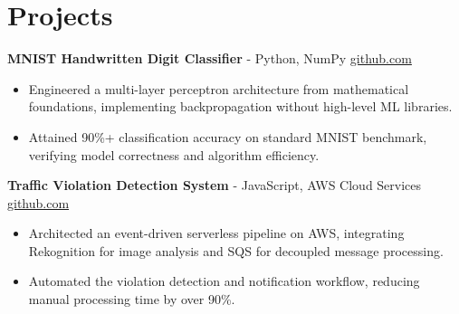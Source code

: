 \documentclass[11pt]{article}       %
\begin{document}

\vspace{-18.5pt}

\section*{Projects}

\textbf{MNIST Handwritten Digit Classifier}{ - Python, NumPy} \hfill \href{https://github.com/Monica20030707/Artificial-Neutral-Network_ML}{github.com} \\
\vspace{-9pt}
\begin{itemize}
  \item Engineered a multi-layer perceptron architecture from mathematical foundations, implementing backpropagation without high-level ML libraries.
  \item Attained 90\%+ classification accuracy on standard MNIST benchmark, verifying model correctness and algorithm efficiency.
\end{itemize}

\textbf{Traffic Violation Detection System}{ - JavaScript, AWS Cloud Services} \hfill \href{https://github.com/Monica20030707/AWS_rekonigition-N-read-database}{github.com} \\
\vspace{-9pt}
\begin{itemize}
  \item Architected an event-driven serverless pipeline on AWS, integrating Rekognition for image analysis and SQS for decoupled message processing.
  \item Automated the violation detection and notification workflow, reducing manual processing time by over 90\%.
\end{itemize}
\end{document}
